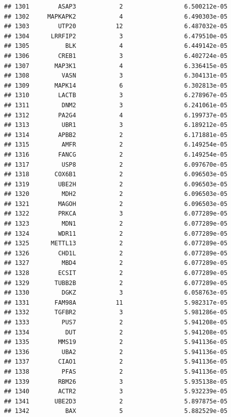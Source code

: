 \documentclass[
]{article}
\begin{document}
\begin{verbatim}
## 1301        ASAP3            2                 6.500212e-05
## 1302     MAPKAPK2            4                 6.490303e-05
## 1303        UTP20           12                 6.487032e-05
## 1304      LRRFIP2            3                 6.479510e-05
## 1305          BLK            4                 6.449142e-05
## 1306        CREB1            3                 6.402724e-05
## 1307       MAP3K1            4                 6.336415e-05
## 1308         VASN            3                 6.304131e-05
## 1309       MAPK14            6                 6.302813e-05
## 1310        LACTB            3                 6.278967e-05
## 1311         DNM2            3                 6.241061e-05
## 1312        PA2G4            4                 6.199737e-05
## 1313         UBR1            3                 6.189212e-05
## 1314        APBB2            2                 6.171881e-05
## 1315         AMFR            2                 6.149254e-05
## 1316        FANCG            2                 6.149254e-05
## 1317         USP8            2                 6.097670e-05
## 1318       COX6B1            2                 6.096503e-05
## 1319        UBE2H            2                 6.096503e-05
## 1320         MDH2            2                 6.096503e-05
## 1321        MAGOH            2                 6.096503e-05
## 1322        PRKCA            3                 6.077289e-05
## 1323         MDN1            2                 6.077289e-05
## 1324        WDR11            2                 6.077289e-05
## 1325      METTL13            2                 6.077289e-05
## 1326        CHD1L            2                 6.077289e-05
## 1327         MBD4            2                 6.077289e-05
## 1328        ECSIT            2                 6.077289e-05
## 1329       TUBB2B            2                 6.077289e-05
## 1330         DGKZ            3                 6.058763e-05
## 1331       FAM98A           11                 5.982317e-05
## 1332       TGFBR2            3                 5.981286e-05
## 1333         PUS7            2                 5.941208e-05
## 1334          DUT            2                 5.941208e-05
## 1335        MMS19            2                 5.941136e-05
## 1336         UBA2            2                 5.941136e-05
## 1337        CIAO1            2                 5.941136e-05
## 1338         PFAS            2                 5.941136e-05
## 1339        RBM26            3                 5.935138e-05
## 1340        ACTR2            3                 5.932239e-05
## 1341       UBE2D3            2                 5.897875e-05
## 1342          BAX            5                 5.882529e-05

\end{verbatim}
\end{document}
